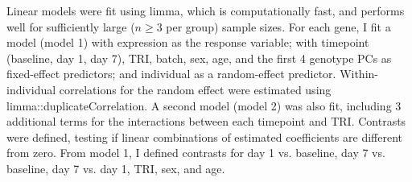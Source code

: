 Linear models were fit using limma\autocite{ritchie2015LimmaPowersDifferential}, which is computationally fast, and performs well for sufficiently large ($n \ge 3$ per group) sample sizes\autocite{soneson2013ComparisonMethodsDifferential}.
For each gene, I fit a model (model 1) with expression as the response variable; with timepoint (baseline, day 1, day 7), \gls{TRI}, batch, sex, age, and the first 4 genotype \glspl{PC} as fixed-effect predictors; and individual as a random-effect predictor.
Within-individual correlations for the random effect were estimated using limma::duplicateCorrelation.
A second model (model 2) was also fit, including 3 additional terms for the interactions between each timepoint and \gls{TRI}.
%
Contrasts were defined, testing if linear combinations of estimated coefficients are different from zero.
From model 1, I defined contrasts for day 1 vs. baseline, day 7 vs. baseline, day 7 vs. day 1, \gls{TRI}, sex, and age.
